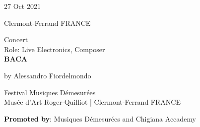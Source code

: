 \documentclass[7pt,a4paper]{article}
\begin{document}
\begin{mdframed}[
    backgroundcolor=entrygray,
    linecolor=entrygray,
    linewidth=0pt,
    innerleftmargin=6pt,
    innerrightmargin=6pt,
    innertopmargin=6pt,
    innerbottommargin=6pt,
    skipabove=0pt,
    skipbelow=0pt
]

\begin{minipage}[t]{0.28\textwidth}

27 Oct 2021

\scriptsize Clermont-Ferrand FRANCE


\end{minipage}
\begin{minipage}[t]{0.68\textwidth}
\small Concert
\\\scriptsize Role: Live Electronics, Composer
\\ \normalsize \textbf{BACA}
\par\scriptsize by Alessandro Fiordelmondo

\vspace{0.25cm}



\small Festival Musiques Démesurées\\Musée d'Art Roger-Quilliot | \scriptsize Clermont-Ferrand FRANCE

\vspace{0.1cm}
\scriptsize

\vspace{0.1cm}
\par \textbf{Promoted by}: Musiques Démesurées and Chigiana Accademy
\end{minipage}
\vspace{0.25cm}
\end{mdframed}
\end{document}
